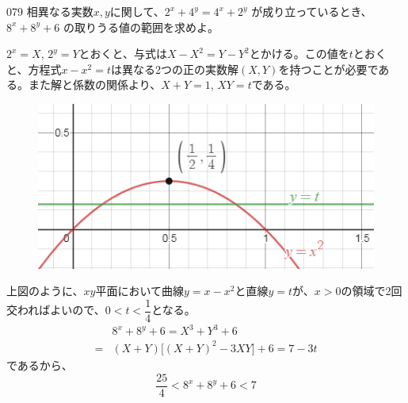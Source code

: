 \begin{thm}{079}{}{}
 相異なる実数$x, y$に関して、$2^x+4^y=4^x+2^y$ が成り立っているとき、$8^x+8^y+6$ の取りうる値の範囲を求めよ。
\end{thm}

$2^x=X$, $2^y=Y$とおくと、与式は$X-X^2=Y-Y^2$とかける。この値を$t$とおくと、方程式$x-x^2=t$は異なる2つの正の実数解$(X, Y)$を持つことが必要である。また解と係数の関係より、$X+Y=1$, $XY=t$である。

\begin{figure}[H]
 \centering
 \includegraphics[width=0.7\linewidth]{../problems/Q_079/A_079.png}
\end{figure}
上図のように、$xy$平面において曲線$y=x-x^2$と直線$y=t$が、$x>0$の領域で2回交わればよいので、$0<t<\dfrac{1}{4}$となる。
\begin{align*}
 &8^x+8^y+6=X^3+Y^3+6 \\
 =&(X+Y)\bigl[(X+Y)^2-3XY\bigr]+6=7-3t
\end{align*}
であるから、
\[ \frac{25}{4}<8^x+8^y+6<7 \]